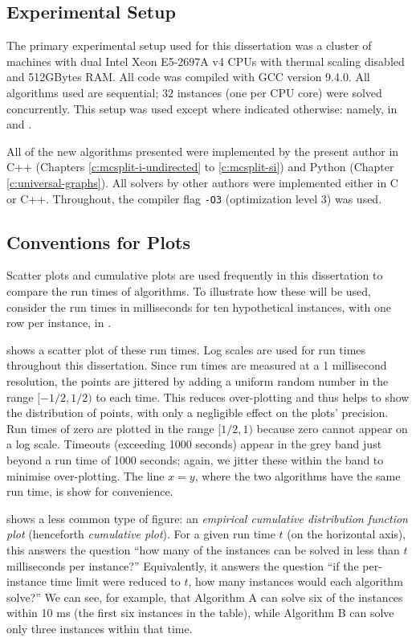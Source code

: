 \subsection{Experimental Setup}

The primary experimental setup used for this dissertation was a cluster
of machines with dual Intel Xeon E5-2697A v4 CPUs with thermal scaling disabled
and 512GBytes RAM. All code was compiled with GCC version 9.4.0.
All algorithms used are sequential; 32 instances
(one per CPU core) were solved concurrently.
This setup was used except where indicated otherwise: namely, in
 and .

All of the new algorithms presented were implemented by the present author in
C++ (Chapters \ref{c:mcsplit-i-undirected} to \ref{c:mcsplit-si})
and Python (Chapter \ref{c:universal-graphs}).  All solvers by other
authors were implemented either in C or C++.  Throughout, the 
compiler flag \texttt{-O3} (optimization level 3) was used.

\subsection{Conventions for Plots}

Scatter plots and cumulative plots are used frequently in this dissertation to
compare the run times of algorithms.  To illustrate how these will be used,
consider the run times in milliseconds for ten hypothetical instances,
with one row per instance, in .

 shows a scatter plot of these run times. Log
scales are used for run times throughout this dissertation. Since run times are
measured at a 1 millisecond resolution, the points are jittered by adding a
uniform random number in the range $[-1/2,1/2)$ to each time. This reduces
over-plotting and thus helps to show the distribution of points, with only a
negligible effect on the plots' precision. Run times of zero are plotted in the
range $[1/2,1)$ because zero cannot appear on a log scale.  Timeouts (exceeding
1000 seconds) appear in the grey band just beyond a run time of 1000 seconds;
again, we jitter these within the band to minimise over-plotting. The line
$x=y$, where the two algorithms have the same run time, is show for
convenience.

 shows a less common type of figure: an
\emph{empirical cumulative distribution function plot} (henceforth
\emph{cumulative plot}). For a given run time $t$ (on the horizontal axis),
this answers the question ``how many of the instances can be solved in less
than $t$ milliseconds per instance?'' Equivalently, it answers the question
``if the per-instance time limit were reduced to $t$, how many instances would
each algorithm solve?''
We can see, for example, that Algorithm A can solve six
of the instances within 10 ms (the first six instances in the table),
while Algorithm B can solve only three instances
within that time.

